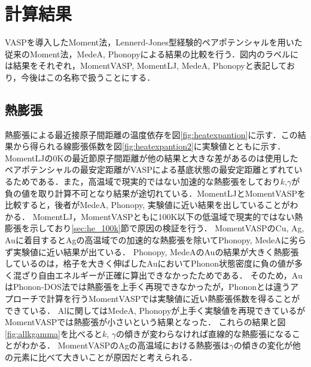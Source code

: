 \chapter{計算結果}
VASPを導入したMoment法，Lennerd-Jones型経験的ペアポテンシャルを用いた従来のMoment法，MedeA, Phonopyによる結果の比較を行う．図内のラベルには結果をそれぞれ，MomentVASP, MomentLJ, MedeA, Phonopyと表記しており，今後はこの名称で扱うことにする．
\section{熱膨張}
熱膨張による最近接原子間距離の温度依存を図\ref{fig:heatexpantion}に示す．この結果から得られる線膨張係数を図\ref{fig:heatexpantion2}に実験値とともに示す．
MomentLJの0Kの最近節原子間距離が他の結果と大きな差があるのは使用したペアポテンシャルの最安定距離がVASPによる基底状態の最安定距離とずれているためである．また，高温域で現実的ではない加速的な熱膨張をしており$k$,$\gamma$が負の値を取り計算不可となり結果が途切れている．MomentLJとMomentVASPを比較すると，後者がMedeA, Phonopy, 実験値に近い結果を出していることがわかる．
MomentLJ，MomentVASPともに100K以下の低温域で現実的ではない熱膨張を示しており\ref{sec:he_100k}節で原因の検証を行う．
MomentVASPのCu, Ag, Auに着目するとAgの高温域での加速的な熱膨張を除いてPhonopy, MedeAに劣らず実験値に近い結果が出ている．
Phonopy, MedeAのAuの結果が大きく熱膨張しているのは，格子を大きく伸ばしたAuにおいてPhonon状態密度に負の値が多く混ざり自由エネルギーが正確に算出できなかったためである．
そのため，AuはPhonon-DOS法では熱膨張を上手く再現できなかったが，Phononとは違うアプローチで計算を行うMomentVASPでは実験値に近い熱膨張係数を得ることができている．
Alに関してはMedeA, Phonopyが上手く実験値を再現できているがMomentVASPでは熱膨張が小さいという結果となった．
これらの結果と図\ref{fig:allkgamma}を比べると$k$, $\gamma$の傾きが変わらなければ直線的な熱膨張になることがわかる．
MomentVASPのAgの高温域における熱膨張は$\gamma$の傾きの変化が他の元素に比べて大きいことが原因だと考えられる．
